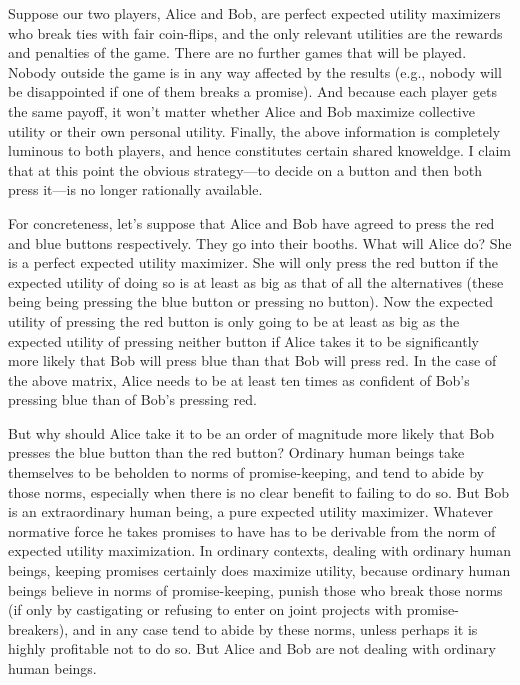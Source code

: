 Suppose our two players, Alice and Bob, are perfect expected utility maximizers who break ties with fair coin-flips, 
and the only relevant utilities are the  rewards and penalties of the game. There are no further games that 
will be played. Nobody outside the game is in any way affected by the results (e.g., nobody will be disappointed 
if one of them breaks a promise). And because each player gets the same payoff, it won't matter whether Alice and Bob
maximize collective utility or their own personal utility. Finally, the above information is completely luminous to 
both players, and hence constitutes certain shared knoweldge. I claim that at this point the obvious strategy---to decide on a button and then both press it---is no 
longer rationally available.

For concreteness, let's suppose that Alice and Bob have agreed to press the red and blue buttons respectively. They go into their booths. 
What will Alice do? She is a perfect expected  utility maximizer. She will only press the red button if the expected
utility of doing so is at least as big as that of all the alternatives (these being being pressing the blue button or 
pressing no button). Now the expected utility of pressing the red button is only going to be at least as big as the
expected utility of pressing neither button if Alice takes it to be significantly more likely that Bob will press blue
than that Bob will press red. In the case of the above matrix, Alice needs to be at least ten times as confident
of Bob's pressing blue than of Bob's pressing red.

But why should Alice take it to be an order of magnitude more likely that Bob presses the blue button than the red button? 
Ordinary human beings take themselves to be beholden to norms of promise-keeping, and tend to abide by those norms,
especially when there is no clear benefit to failing to do so. But Bob is an extraordinary human being, a pure expected utility maximizer. Whatever
normative force he takes promises to have has to be derivable from the norm of expected utility maximization. In ordinary
contexts, dealing with ordinary human beings, keeping promises certainly does maximize utility, because ordinary human beings
believe in norms of promise-keeping, punish those who break those norms (if only by castigating or refusing to enter on
joint projects with promise-breakers), and in any case tend to abide by these norms, unless perhaps it is highly
profitable not to do so. But Alice and Bob are not dealing with ordinary human beings.

